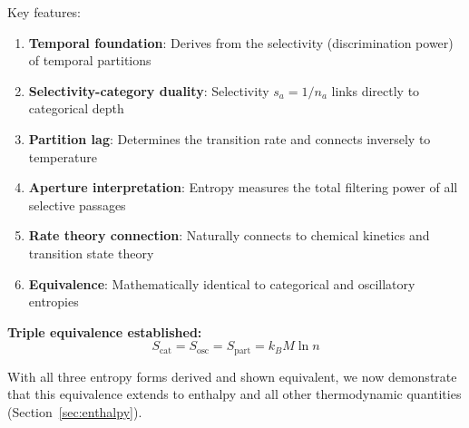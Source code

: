 Key features:
\begin{enumerate}
\item \textbf{Temporal foundation}: Derives from the selectivity (discrimination power) of temporal partitions
\item \textbf{Selectivity-category duality}: Selectivity $s_a = 1/n_a$ links directly to categorical depth
\item \textbf{Partition lag}: Determines the transition rate and connects inversely to temperature
\item \textbf{Aperture interpretation}: Entropy measures the total filtering power of all selective passages
\item \textbf{Rate theory connection}: Naturally connects to chemical kinetics and transition state theory
\item \textbf{Equivalence}: Mathematically identical to categorical and oscillatory entropies
\end{enumerate}

\textbf{Triple equivalence established:}
\begin{equation}
S_{\text{cat}} = S_{\text{osc}} = S_{\text{part}} = k_B M \ln n
\end{equation}

With all three entropy forms derived and shown equivalent, we now demonstrate that this equivalence extends to enthalpy and all other thermodynamic quantities (Section~\ref{sec:enthalpy}).

